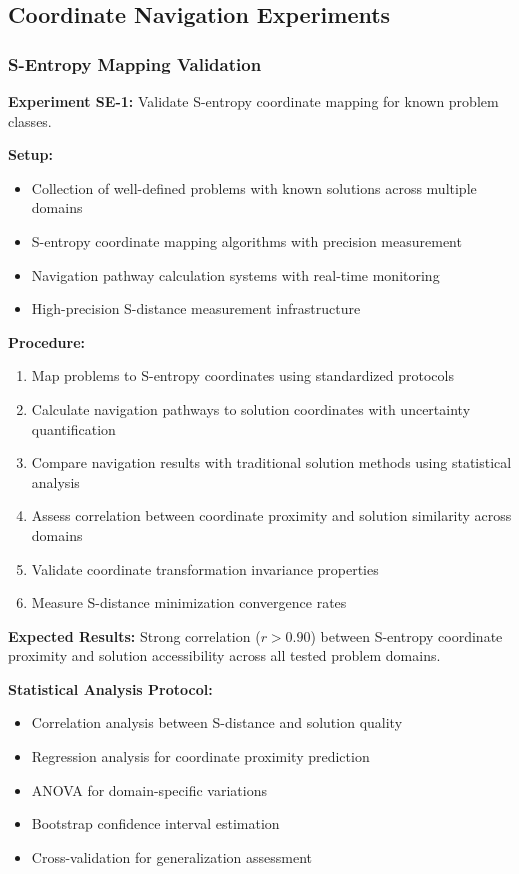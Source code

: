 \documentclass[11pt]{article}
\theoremstyle{definition}
\theoremstyle{remark}
\begin{document}
\subsection{Coordinate Navigation Experiments}

\subsubsection{S-Entropy Mapping Validation}

\textbf{Experiment SE-1:} Validate S-entropy coordinate mapping for known problem classes.

\textbf{Setup:}
\begin{itemize}
\item Collection of well-defined problems with known solutions across multiple domains
\item S-entropy coordinate mapping algorithms with precision measurement
\item Navigation pathway calculation systems with real-time monitoring
\item High-precision S-distance measurement infrastructure
\end{itemize}

\textbf{Procedure:}
\begin{enumerate}
\item Map problems to S-entropy coordinates using standardized protocols
\item Calculate navigation pathways to solution coordinates with uncertainty quantification
\item Compare navigation results with traditional solution methods using statistical analysis
\item Assess correlation between coordinate proximity and solution similarity across domains
\item Validate coordinate transformation invariance properties
\item Measure S-distance minimization convergence rates
\end{enumerate}

\textbf{Expected Results:} Strong correlation ($r > 0.90$) between S-entropy coordinate proximity and solution accessibility across all tested problem domains.

\textbf{Statistical Analysis Protocol:}
\begin{itemize}
\item Correlation analysis between S-distance and solution quality
\item Regression analysis for coordinate proximity prediction
\item ANOVA for domain-specific variations
\item Bootstrap confidence interval estimation
\item Cross-validation for generalization assessment
\end{itemize}
\end{document}
